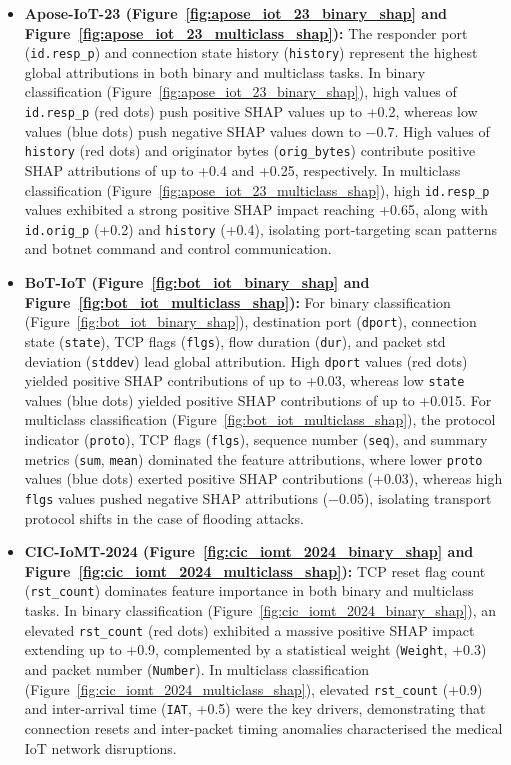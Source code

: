 \documentclass[a4paper,fleqn]{cas-sc}
\begin{document}
\begin{itemize}
    \item \textbf{Apose-IoT-23 (Figure~\ref{fig:apose_iot_23_binary_shap} and Figure~\ref{fig:apose_iot_23_multiclass_shap}):} The responder port (\texttt{id.resp\_p}) and connection state history (\texttt{history}) represent the highest global attributions in both binary and multiclass tasks. In binary classification (Figure~\ref{fig:apose_iot_23_binary_shap}), high values of \texttt{id.resp\_p} (red dots) push positive SHAP values up to +0.2, whereas low values (blue dots) push negative SHAP values down to $-0.7$. High values of \texttt{history} (red dots) and originator bytes (\texttt{orig\_bytes}) contribute positive SHAP attributions of up to +0.4 and +0.25, respectively. In multiclass classification (Figure~\ref{fig:apose_iot_23_multiclass_shap}), high \texttt{id.resp\_p} values exhibited a strong positive SHAP impact reaching +0.65, along with \texttt{id.orig\_p} (+0.2) and \texttt{history} (+0.4), isolating port-targeting scan patterns and botnet command and control communication.
    \item \textbf{BoT-IoT (Figure~\ref{fig:bot_iot_binary_shap} and Figure~\ref{fig:bot_iot_multiclass_shap}):} For binary classification (Figure~\ref{fig:bot_iot_binary_shap}), destination port (\texttt{dport}), connection state (\texttt{state}), TCP flags (\texttt{flgs}), flow duration (\texttt{dur}), and packet std deviation (\texttt{stddev}) lead global attribution. High \texttt{dport} values (red dots) yielded positive SHAP contributions of up to +0.03, whereas low \texttt{state} values (blue dots) yielded positive SHAP contributions of up to +0.015. For multiclass classification (Figure~\ref{fig:bot_iot_multiclass_shap}), the protocol indicator (\texttt{proto}), TCP flags (\texttt{flgs}), sequence number (\texttt{seq}), and summary metrics (\texttt{sum}, \texttt{mean}) dominated the feature attributions, where lower \texttt{proto} values (blue dots) exerted positive SHAP contributions (+0.03), whereas high \texttt{flgs} values pushed negative SHAP attributions ($-0.05$), isolating transport protocol shifts in the case of flooding attacks.
    \item \textbf{CIC-IoMT-2024 (Figure~\ref{fig:cic_iomt_2024_binary_shap} and Figure~\ref{fig:cic_iomt_2024_multiclass_shap}):} TCP reset flag count (\texttt{rst\_count}) dominates feature importance in both binary and multiclass tasks. In binary classification (Figure~\ref{fig:cic_iomt_2024_binary_shap}), an elevated \texttt{rst\_count} (red dots) exhibited a massive positive SHAP impact extending up to +0.9, complemented by a statistical weight (\texttt{Weight}, +0.3) and packet number (\texttt{Number}). In multiclass classification (Figure~\ref{fig:cic_iomt_2024_multiclass_shap}), elevated \texttt{rst\_count} (+0.9) and inter-arrival time (\texttt{IAT}, +0.5) were the key drivers, demonstrating that connection resets and inter-packet timing anomalies characterised the medical IoT network disruptions.

\end{itemize}
\end{document}
